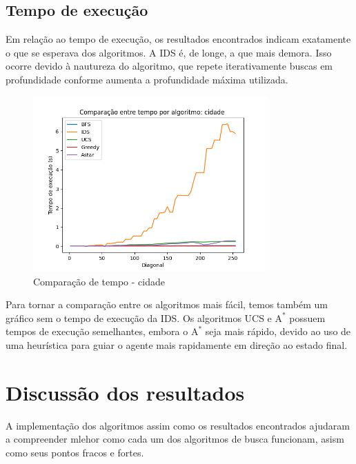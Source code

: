 \documentclass{article}
\begin{document}
\subsection{Tempo de execução}

Em relação ao tempo de execução, os resultados encontrados indicam exatamente o que se esperava dos algoritmos. A IDS é, de longe, a que mais demora. Isso ocorre devido à nautureza do algoritmo,
que repete iterativamente buscas em profundidade conforme aumenta a profundidade máxima utilizada. 

\begin{figure}[H]
	\centering
	\includegraphics[width=0.8\textwidth]{../images/cidade_time_benchmark.png}
	\caption{Comparação de tempo - cidade}
\end{figure}

Para tornar a comparação entre os algoritmos mais fácil, temos também um gráfico sem o tempo de execução da IDS. Os algoritmos UCS e \(\text{A}^*\) possuem tempos de execução semelhantes,
embora o \(\text{A}^*\) seja mais rápido, devido ao uso de uma heurística para guiar o agente mais rapidamente em direção ao estado final. 


\section{Discussão dos resultados}

A implementação dos algoritmos assim como os resultados encontrados ajudaram a compreender mlehor como cada um dos algoritmos de busca funcionam,
asism como seus pontos fracos e fortes.
\end{document}

